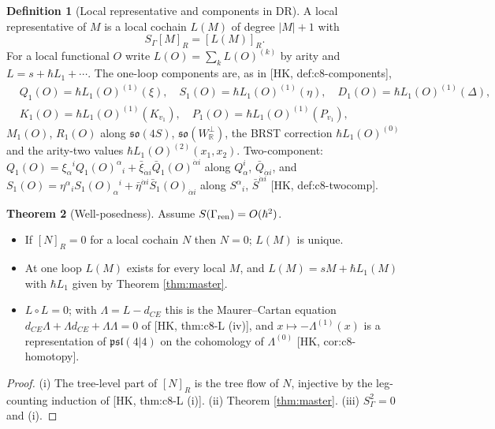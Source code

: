 \documentclass[11pt]{article}
\theoremstyle{definition}
\newtheorem{definition}{Definition}[section]
\newtheorem{theorem}[definition]{Theorem}
\numberwithin{equation}{section}
\begin{document}
\begin{definition}[Local representative and components in DR]
\label{def:comp}
A local representative of $M$ is a local cochain $L(M)$ of degree $|M|+1$ with
\begin{equation}
S_\Gamma[M]_R=[L(M)]_R .
\label{eq:repD}
\end{equation}
For a local functional $O$ write $L(O)=\sum_kL(O)^{(k)}$ by arity and $L=s+\hbar L_1+\cdots$. The one-loop components are, as in [HK, def:c8-components],
\[
\begin{aligned}
&Q_1(O)=\hbar L_1(O)^{(1)}(\xi),\quad S_1(O)=\hbar L_1(O)^{(1)}(\eta),\quad D_1(O)=\hbar L_1(O)^{(1)}(\Delta),\\
&K_1(O)=\hbar L_1(O)^{(1)}(K_{v_1}),\quad P_1(O)=\hbar L_1(O)^{(1)}(P_{v_1}),
\end{aligned}
\]
$M_1(O)$, $R_1(O)$ along $\mathfrak{so}(4S)$, $\mathfrak{so}(W^\perp_{\mathbb R})$, the BRST correction $\hbar L_1(O)^{(0)}$ and the arity-two values $\hbar L_1(O)^{(2)}(x_1,x_2)$. Two-component: $Q_1(O)=\xi_\alpha{}^iQ_1(O)^\alpha{}_i+\bar\xi_{\dot\alpha i}\bar Q_1(O)^{\dot\alpha i}$ along $Q^i_\alpha$, $\bar Q_{\dot\alpha i}$, and $S_1(O)=\eta^\alpha{}_iS_1(O)_\alpha{}^i+\bar\eta^{\dot\alpha i}\bar S_1(O)_{\dot\alpha i}$ along $S^\alpha{}_i$, $\bar S^{\dot\alpha i}$ [HK, def:c8-twocomp].
\end{definition}

\begin{theorem}[Well-posedness]
\label{thm:wellposed}
Assume $S(\Gamma_{\rm ren})=O(\hbar^2)$.
\begin{itemize}
\item[(i)] If $[N]_R=0$ for a local cochain $N$ then $N=0$; $L(M)$ is unique.
\item[(ii)] At one loop $L(M)$ exists for every local $M$, and $L(M)=sM+\hbar L_1(M)$ with $\hbar L_1$ given by Theorem \ref{thm:master}.
\item[(iii)] $L\circ L=0$; with $\Lambda=L-d_{CE}$ this is the Maurer--Cartan equation $d_{CE}\Lambda+\Lambda d_{CE}+\Lambda\Lambda=0$ of [HK, thm:c8-L (iv)], and $x\mapsto-\Lambda^{(1)}(x)$ is a representation of $\mathfrak{psl}(4|4)$ on the cohomology of $\Lambda^{(0)}$ [HK, cor:c8-homotopy].
\end{itemize}
\end{theorem}

\begin{proof}
(i) The tree-level part of $[N]_R$ is the tree flow of $N$, injective by the leg-counting induction of [HK, thm:c8-L (i)]. (ii) Theorem \ref{thm:master}. (iii) $S_\Gamma^2=0$ and (i).
\end{proof}
\end{document}
